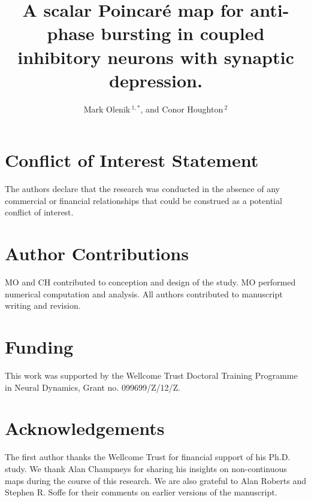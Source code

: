 \documentclass[utf8]{frontiersFPHY} %
\def\firstAuthorLast{Olenik {et~al.}} %
\def\Authors{Mark Olenik\,$^{1,*}$, and Conor Houghton\,$^{2}$}
\begin{document}
\onecolumn
{}


\title[Scalar Poincaré map for bursting]{A scalar Poincaré map for anti-phase bursting in coupled inhibitory neurons with synaptic depression.}


\author[\firstAuthorLast ]{\Authors} %
\address{} %
\correspondance{} %

\extraAuth{}%

\maketitle






\section*{Conflict of Interest Statement}
The authors declare that the research was conducted in the absence of any commercial or
financial relationships that could be construed as a potential conflict of interest.

\section*{Author Contributions}
MO and CH contributed to conception and design of the study.
MO performed numerical computation and analysis.
All authors contributed to manuscript writing and revision.

\section*{Funding}
This work was supported by the Wellcome Trust Doctoral Training Programme in Neural
Dynamics, Grant no. 099699/Z/12/Z.

\section*{Acknowledgements}
The first author thanks the Wellcome Trust for financial support of his Ph.D. study.
We thank Alan Champneys for sharing his insights on non-continuous maps during the course of this research.
We are also grateful to Alan Roberts and Stephen R. Soffe for their comments on earlier versions of the manuscript.
\end{document}
